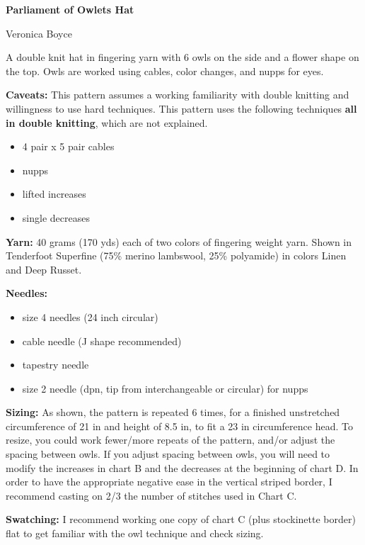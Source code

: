 \documentclass[11pt]{article}
\begin{document}
\begin{centering}
	
\textbf{\LARGE Parliament of Owlets Hat}
\medskip

{\large Veronica Boyce}

\smallskip

\end{centering}


A double knit hat in fingering yarn with 6 owls on the side and a flower shape on the top. Owls are worked using cables, color changes, and nupps for eyes. 
\smallskip

\textbf{Caveats:} This pattern assumes a working familiarity with double knitting and willingness to use hard techniques. This pattern uses the following techniques \textbf{all in double knitting}, which are not explained.
\begin{itemize}
	\item 4 pair x 5 pair cables
	\item nupps
	\item lifted increases
	\item single decreases
\end{itemize}

\smallskip
\textbf{Yarn:} 40 grams (170 yds) each of two colors of fingering weight yarn. Shown in Tenderfoot Superfine (75\% merino lambswool, 25\% polyamide) in colors Linen and Deep Russet. 


\textbf{Needles:} \begin{itemize}
	\item size 4 needles (24 inch circular)
	\item cable needle (J shape recommended)
	\item tapestry needle
	\item size 2 needle (dpn, tip from interchangeable or circular) for nupps
\end{itemize}

\smallskip
\textbf{Sizing:} As shown, the pattern is repeated 6 times, for a finished unstretched circumference of 21 in and height of 8.5 in, to fit a 23 in circumference head. To resize, you could work fewer/more repeats of the pattern, and/or adjust the spacing between owls. If you adjust spacing between owls, you will need to modify the increases in chart B and the decreases at the beginning of chart D. In order to have the appropriate negative ease in the vertical striped border, I recommend casting on 2/3 the number of stitches used in Chart C. 

\smallskip
\textbf{Swatching:} I recommend working one copy of chart C (plus stockinette border) flat to get familiar with the owl technique and check sizing. 
\end{document}
